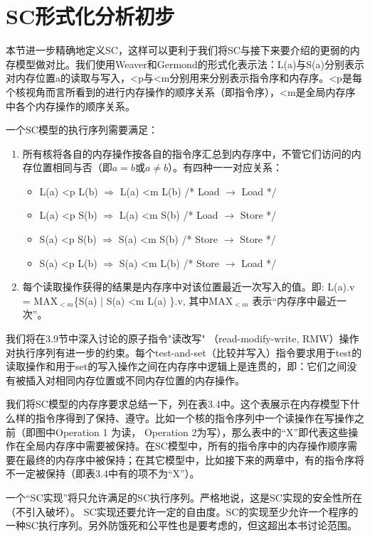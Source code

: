 \documentclass[UTF-8]{ctexrep}
\begin{document}
\section{SC形式化分析初步}
本节进一步精确地定义SC，这样可以更利于我们将SC与接下来要介绍的更弱的内存模型做对比。我们使用Weaver和Germond的形式化表示法：L(a)与S(a)分别表示对内存位置a的读取与写入，<p与<m分别用来分别表示指令序和内存序。<p是每个核视角而言所看到的进行内存操作的顺序关系（即指令序），<m是全局内存序中各个内存操作的顺序关系。
\par 一个SC模型的执行序列需要满足：
\begin{enumerate}
\item 所有核将各自的内存操作按各自的指令序汇总到内存序中，不管它们访问的内存位置相同与否（即$a = b$或$a \neq b$）。有四种一一对应关系：
\begin{itemize}
\item  L(a) <p L(b)  $\Rightarrow$ L(a) <m L(b)  /* Load $\rightarrow$ Load */
\item  L(a) <p S(b)  $\Rightarrow$ L(a) <m S(b) /* Load $\rightarrow$ Store */
\item  S(a) <p S(b)  $\Rightarrow$ S(a) <m S(b) /* Store $\rightarrow$ Store */
\item  S(a) <p L(b)  $\Rightarrow$ S(a) <m L(b) /* Store $\rightarrow$ Load */
\end{itemize}
\item 每个读取操作获得的结果是内存序中对该位置最近一次写入的值。即: L(a).v = MAX$_{<m}$\{S(a) | S(a) <m L(a) \}.v,  其中MAX$_{<m}$ 表示“内存序中最近一次”。
\end{enumerate}
\par 我们将在3.9节中深入讨论的原子指令"读改写" （read-modify-write, RMW）操作对执行序列有进一步的约束。每个test-and-set（比较并写入）指令要求用于test的读取操作和用于set的写入操作之间在内存序中逻辑上是连贯的，即：它们之间没有被插入对相同内存位置或不同内存位置的内存操作。
\par 我们将SC模型的内存序要求总结一下，列在表3.4中。这个表展示在内存模型下什么样的指令序得到了保持、遵守。比如一个核的指令序列中一个读操作在写操作之前（即图中Operation 1 为读， Operation 2为写），那么表中的“X”即代表这些操作在全局内存序中需要被保持。在SC模型中，所有的指令序中的内存操作顺序需要在最终的内存序中被保持；在其它模型中，比如接下来的两章中，有的指令序将不一定被保持（即表3.4中有的项不为“X”）。
\par 一个“SC实现”将只允许满足的SC执行序列。严格地说，这是SC实现的安全性所在（不引入破坏）。 SC实现还要允许一定的自由度。SC的实现至少允许一个程序的一种SC执行序列。另外防饿死和公平性也是要考虑的，但这超出本书讨论范围。
\end{document}
